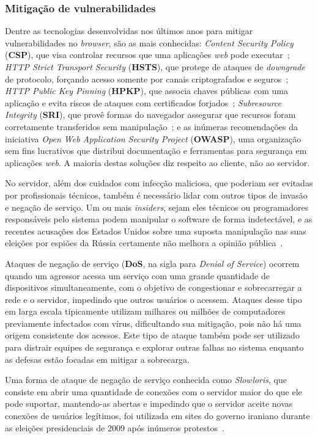 \subsubsection{Mitigação de vulnerabilidades}

Dentre as tecnologias desenvolvidas nos últimos anos para mitigar
vulnerabilidades no \textit{browser}, são as mais conhecidas:
\textit{Content Security Policy} (\textbf{CSP}), que visa controlar recursos
que uma aplicações \textit{web} pode executar~\cite{west2016csp};
\textit{HTTP Strict Transport Security} (\textbf{HSTS}), que protege de ataques
de \textit{downgrade} de protocolo, forçando acesso somente por canais
criptografados e seguros~\cite{rfc6797}; \textit{HTTP Public Key Pinning}
(\textbf{HPKP}), que associa chaves públicas com uma aplicação e evita riscos
de ataques com certificados forjados~\cite{rfc7469};
\textit{Subresource Integrity} (\textbf{SRI}), que provê formas do navegador
assegurar que recursos foram corretamente transferidos sem
manipulação~\cite{akhawe2016sri}; e as inúmeras recomendações da iniciativa
\textit{Open Web Application Security Project} (\textbf{OWASP}), uma
organização sem fins lucrativos que distribui documentação e ferramentas para
segurança em aplicações \textit{web}. A maioria destas soluções diz respeito ao
cliente, não ao servidor.

No servidor, além dos cuidados com infecção maliciosa, que poderiam ser
evitadas por profissionais técnicos, também é necessário lidar com outros tipos
de invasão e negação de serviço. Um ou mais \textit{insiders}, sejam eles
técnicos ou programadores responsáveis pelo sistema podem manipular o software
de forma indetectável, e as recentes acusações dos Estados Unidos sobre uma
suposta manipulação nas suas eleições por espiões da Rússia certamente não
melhora a opinião pública~\cite{badawy2018analyzing}.

Ataques de negação de serviço (\textbf{DoS}, na sigla para
\textit{Denial of Service}) ocorrem quando um agressor acessa um serviço com
uma grande quantidade de dispositivos simultaneamente, com o objetivo de
congestionar e sobrecarregar a rede e o servidor, impedindo que outros usuários
o acessem.  Ataques desse tipo em larga escala tipicamente utilizam milhares ou
milhões de computadores previamente infectados com vírus, dificultando sua
mitigação, pois não há uma origem consistente dos acessos. Este tipo de ataque
também pode ser utilizado para distrair equipes de segurança e explorar outras
falhas no sistema enquanto as defesas estão focadas em mitigar a sobrecarga.

Uma forma de ataque de negação de serviço conhecida como \textit{Slowloris},
que consiste em abrir uma quantidade de conexões com o servidor maior do que
ele pode suportar, mantendo-as abertas e impedindo que o servidor aceite novas
conexões de usuários legítimos, foi utilizada em sites do governo iraniano
durante as eleições presidenciais de 2009 após inúmeros
protestos~\cite{zdrnja2009slowloris}.

